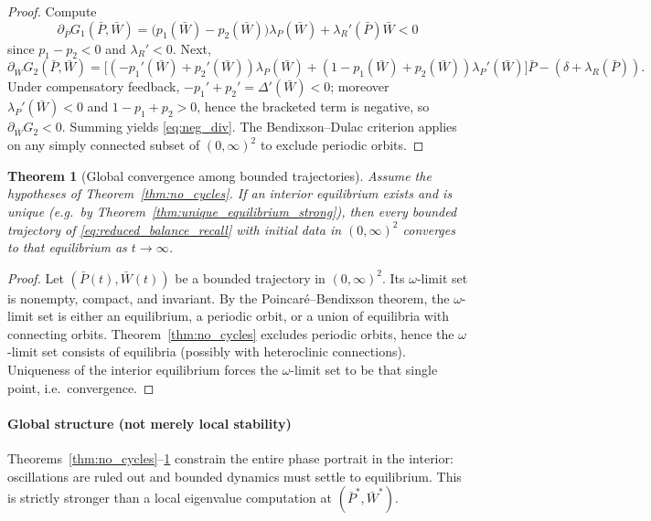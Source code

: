 \documentclass[pdflatex,sn-mathphys-ay]{sn-jnl}
\theoremstyle{thmstyleone}
\newtheorem{theorem}{Theorem}[section]
\theoremstyle{definition}
\theoremstyle{remark}
\begin{document}
\begin{proof}
Compute
\[
\partial_{\bar P}G_1(\bar P,\bar W)
=\big(p_1(\bar W)-p_2(\bar W)\big)\lambda_P(\bar W)+\lambda_R'(\bar P)\bar W<0
\]
since $p_1-p_2<0$ and $\lambda_R'<0$.
Next,
\[
\partial_{\bar W}G_2(\bar P,\bar W)
=\Big[(-p_1'(\bar W)+p_2'(\bar W))\lambda_P(\bar W)
+(1-p_1(\bar W)+p_2(\bar W))\lambda_P'(\bar W)\Big]\bar P-(\delta+\lambda_R(\bar P)).
\]
Under compensatory feedback, $-p_1'+p_2'=\Delta'(\bar W)<0$; moreover $\lambda_P'(\bar W)<0$ and
$1-p_1+p_2>0$, hence the bracketed term is negative, so $\partial_{\bar W}G_2<0$.
Summing yields \eqref{eq:neg_div}. The Bendixson--Dulac criterion \citep{perko_differential_2001} applies on any simply connected
subset of $(0,\infty)^2$ to exclude periodic orbits.
\end{proof}

\begin{theorem}[Global convergence among bounded trajectories]
\label{thm:global_convergence}
Assume the hypotheses of Theorem~\ref{thm:no_cycles}. If an interior equilibrium exists and is
unique (e.g.\ by Theorem~\ref{thm:unique_equilibrium_strong}), then every bounded trajectory of \eqref{eq:reduced_balance_recall}
with initial data in $(0,\infty)^2$ converges to that equilibrium as $t\to\infty$.
\end{theorem}

\begin{proof}
Let $(\bar P(t),\bar W(t))$ be a bounded trajectory in $(0,\infty)^2$.
Its $\omega$-limit set is nonempty, compact, and invariant. By the Poincar\'e--Bendixson theorem,
the $\omega$-limit set is either an equilibrium, a periodic orbit, or a union of equilibria with
connecting orbits. Theorem~\ref{thm:no_cycles} excludes periodic orbits, hence the $\omega$-limit set
consists of equilibria (possibly with heteroclinic connections). Uniqueness of the interior equilibrium
forces the $\omega$-limit set to be that single point, i.e.\ convergence.
\end{proof}

\paragraph{Global structure (not merely local stability)}
Theorems~\ref{thm:no_cycles}--\ref{thm:global_convergence} constrain the entire phase portrait
in the interior: oscillations are ruled out and bounded dynamics must settle to equilibrium. This is
strictly stronger than a local eigenvalue computation at $(\bar P^*,\bar W^*)$.
\end{document}
